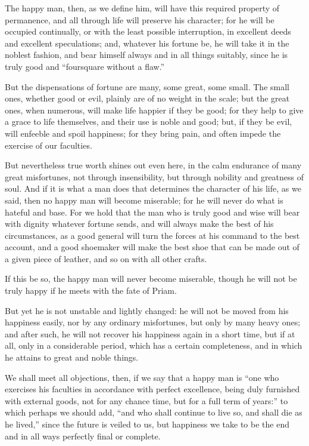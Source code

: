 The happy man, then, as we define him, will have this required
property of permanence, and all through life will preserve his
character; for he will be occupied continually, or with the least
possible interruption, in  excellent deeds and excellent
speculations; and, whatever his fortune be, he will take it in the
noblest fashion, and bear himself always and in all things suitably,
since he is truly good and ``foursquare without a flaw.''

But the dispensations of fortune are many, some great, some small. The
small ones, whether good or evil, plainly are of no weight in the
scale; but the great ones, when numerous, will make life happier if
they be good; for they help to give a grace to life themselves, and
their use is noble and good; but, if they be evil, will enfeeble and
spoil happiness; for they bring pain, and often impede the exercise of
our faculties.

But nevertheless true worth shines out even here, in the calm
en\-dur\-ance of many great misfortunes, not through insensibility,
but through nobility and greatness of soul. And if it is what a man
does that determines the character of his life, as we said, then no
happy man will become miserable; for he will never do what is hateful
and base. For we hold that the man who is truly good and wise will
bear with dignity whatever fortune sends, and will always make the
best of his circumstances, as a good general will turn the forces at
his command to the best account, and a good shoemaker will make the
best shoe that can be made out of a given piece of leather, and so on
with all other crafts.

If this be so, the happy man will never become miserable, though he
will not be truly happy if he meets with the fate of Priam.

But yet he is not unstable and lightly changed: he  will not
be moved from his happiness easily, nor by any ordinary misfortunes,
but only by many heavy ones; and after such, he will not recover his
happiness again in a short time, but if at all, only in a considerable
period, which has a certain completeness, and in which he attains to
great and noble things.

We shall meet all objections, then, if we say that a happy man is
``one who exercises his faculties in accordance with perfect
excellence, being duly furnished with external goods, not for any
chance time, but for a full term of years:'' to which perhaps we
should add, ``and who shall continue to live so, and shall die as he
lived,'' since the future is veiled to us, but happiness we take to be
the end and in all ways perfectly final or complete.

